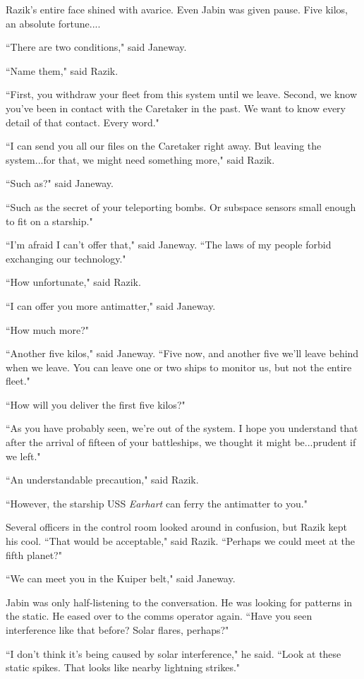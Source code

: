 \documentclass[twoside,letterpaper,12pt]{memoir}
\begin{document}
Razik's entire face shined with avarice. Even Jabin was given pause. Five kilos, an absolute fortune....

``There are two conditions," said Janeway.

``Name them," said Razik.

``First, you withdraw your fleet from this system until we leave. Second, we know you've been in contact with the Caretaker in the past. We want to know every detail of that contact. Every word."

``I can send you all our files on the Caretaker right away. But leaving the system...for that, we might need something more," said Razik.

``Such as?" said Janeway.

``Such as the secret of your teleporting bombs. Or subspace sensors small enough to fit on a starship."

``I'm afraid I can't offer that," said Janeway. ``The laws of my people forbid exchanging our technology."

``How unfortunate," said Razik.

``I can offer you more antimatter," said Janeway.

``How much more?"

``Another five kilos," said Janeway. ``Five now, and another five we'll leave behind when we leave. You can leave one or two ships to monitor us, but not the entire fleet."

``How will you deliver the first five kilos?"

``As you have probably seen, we're out of the system. I hope you understand that after the arrival of fifteen of your battleships, we thought it might be...prudent if we left."

``An understandable precaution," said Razik.

``However, the starship USS \textit{Earhart} can ferry the antimatter to you."

Several officers in the control room looked around in confusion, but Razik kept his cool. ``That would be acceptable," said Razik. ``Perhaps we could meet at the fifth planet?"

``We can meet you in the Kuiper belt," said Janeway.

Jabin was only half-listening to the conversation. He was looking for patterns in the static. He eased over to the comms operator again. ``Have you seen interference like that before? Solar flares, perhaps?"

``I don't think it's being caused by solar interference," he said. ``Look at these static spikes. That looks like nearby lightning strikes."
\end{document}
